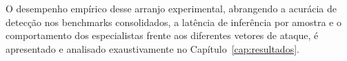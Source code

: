 O desempenho empírico desse arranjo experimental, abrangendo a acurácia de detecção nos benchmarks consolidados, a
latência de inferência por amostra e o comportamento dos especialistas frente aos diferentes vetores de ataque, é
apresentado e analisado exaustivamente no Capítulo~\ref{cap:resultados}.
